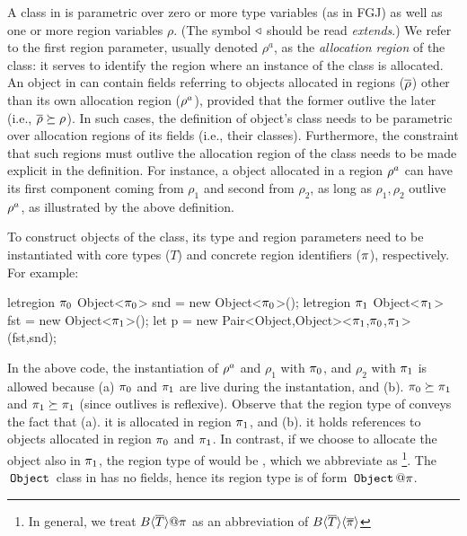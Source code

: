 A class in \FB is parametric over zero or more type variables (as in FGJ) as well as
one or more region variables $\rho$.
(The symbol $\triangleleft$ should be read \emph{extends}.)
We refer to the first region parameter, usually denoted $\rho^a$, as the \emph{allocation
region} of the class: it serves to identify the region where an instance of the class is allocated.
%
An object in \FB can contain fields referring to objects allocated in regions ($\overline{\rho}$) other than its
own allocation region ($\rho^a$), provided that the former outlive
the later (i.e., $\overline{\rho} \succeq \rho$). In such cases, the
definition of object's class needs to be parametric over allocation
regions of its fields (i.e., their classes). Furthermore, the
constraint that such regions must outlive the allocation region of the
class needs to be made explicit in the definition. 
%
For instance, a  object allocated in a region ${\rho^a}$ can have its first
component coming from ${\rho_1}$ and second from $\rho_2$, as long as
$\rho_1, \rho_2$ outlive $\rho^a$, as illustrated by the above definition.

To construct objects of the  class, its type and region
parameters need to be instantiated with core types ($T$) and concrete
region identifiers ($\pi$), respectively. For example:
\begin{codejava}
letregion $\pi_0$ {
  Object<$\pi_0$> snd = new Object<$\pi_0$>();
  letregion $\pi_1$ {
    Object<$\pi_1$> fst = new Object<$\pi_1$>();
    let p = new Pair<Object,Object><$\pi_1$,$\pi_0$,$\pi_1$>
                  (fst,snd);
  }
}
\end{codejava}
In the above code, the instantiation of $\rho^a$ and $\rho_1$ with
$\pi_0$, and $\rho_2$ with $\pi_1$ is allowed because (a) $\pi_0$
and $\pi_1$ are live during the instantation, and (b). $\pi_0
\succeq \pi_1$ and $\pi_1 \succeq \pi_1$ (since outlives is
reflexive). Observe that the region type of  conveys
the fact that (a). it is allocated in region $\pi_1$, and (b). it
holds references to objects allocated in region $\pi_0$ and $\pi_1$.
In contrast, if we choose to allocate the  object also in
$\pi_1$, the region type of  would be
, which we abbreviate
as \footnote{In general, we treat
$B\inang{\tbar}@\rgn$ as an abbreviation of
$B\langle \overline{T} \rangle\langle \overline{\pi} \rangle$}. The $\,{\tt Object}\,$ class in \FB has no
fields, hence its region type is of form $\ObjZ@\rgn$.


